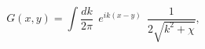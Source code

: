 \begin{equation}
G(x,y) = \int \frac{dk} {2 \pi} ~~e^{i k(x-y)} ~~\frac {1} {2
\sqrt{k^2+\chi}},
\end{equation}

